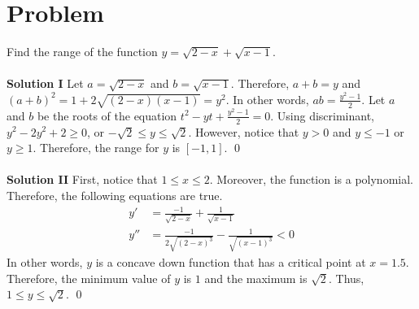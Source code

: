 \documentclass{article}
\begin{document}
\section*{Problem}
Find the range of the function $y = \sqrt{2 - x} + \sqrt{x - 1}$.
\\\\
\textbf{Solution I}
Let $a = \sqrt{2 - x}$ and $b = \sqrt{x - 1}$. Therefore, $a + b = y$ and $(a + b)^2 = 1 + 2\sqrt{(2 - x)(x - 1)} = y^2$. In other words, $ab = \frac{y^2 - 1}{2}$.
Let $a$ and $b$ be the roots of the equation $t^2 - yt + \frac{y^2 - 1}{2} = 0$. Using discriminant, $y^2 - 2y^2 + 2 \geq 0$, or $-\sqrt{2} \leq y \leq \sqrt{2}$. However, notice that $y > 0$ and $y \leq -1$ or $y \geq 1$. Therefore, the range for $y$ is $\boxed{[-1, 1]}$.
\qed
\\\\
\textbf{Solution II}
First, notice that $1 \leq x \leq 2$. Moreover, the function is a polynomial. Therefore, the following equations are true.
\begin{align*}
    y' &= \frac{-1}{\sqrt{2 - x}} + \frac{1}{\sqrt{x - 1}} \\
    y'' &= \frac{-1}{2\sqrt{(2 - x)^3}} - \frac{1}{\sqrt{(x - 1)^3}} < 0
\end{align*}
In other words, $y$ is a concave down function that has a critical point at $x = 1.5$. Therefore, the minimum value of $y$ is $1$ and the maximum is $\sqrt{2}$. Thus, $\boxed{1 \leq y \leq \sqrt{2}}$.
\qed
\end{document}
